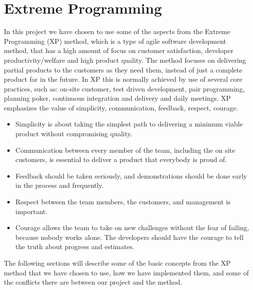
\section{Extreme Programming}
\label{sec:extreme_programming}

In this project we have chosen to use some of the aspects from the Extreme Programming (XP) method, which is a type of agile software development method, that has a high amount of focus on customer satisfaction, developer productivity/welfare and high product quality. The method focuses on delivering partial products to the customers as they need them, instead of just a complete product far in the future. In XP this is normally achieved by use of several core practices, such as: on-site customer, test driven development, pair programming, planning poker, continuous integration and delivery and daily meetings. XP emphasizes the value of simplicity, communication, feedback, respect, courage. 

\begin{itemize}
	\item Simplicity is about taking the simplest path to delivering a minimum viable product without compromising quality. 
	\item Communication between every member of the team, including the on site customers, is essential to deliver a product that everybody is proud of. 
	\item Feedback should be taken seriously, and demonstrations should be done early in the process and frequently.
	\item Respect between the team members, the customers, and management is important.
	\item Courage allows the team to take on new challenges without the fear of failing, because nobody works alone. The developers should have the courage to tell the truth about progress and estimates. 
\end{itemize}

The following sections will describe some of the basic concepts from the XP method that we have chosen to use, how we have implemented them, and some of the conflicts there are between our project and the method.

